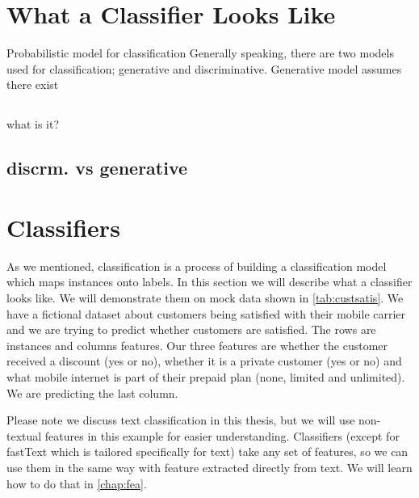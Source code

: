 \section{What a Classifier Looks Like}

Probabilistic model for classification
Generally speaking, there are two models used for classification; generative and discriminative. Generative model assumes there exist 

\subsection{}

what is it?

\subsection{discrm. vs generative}


\section{Classifiers}
\label{chap:clscon}

As we mentioned, classification is a process of building a classification model which maps
instances onto labels.
In this section we will describe what a classifier looks like.
We will demonstrate them on mock data shown in \autoref{tab:custsatis}.
We have a fictional dataset about customers being satisfied with their mobile carrier and
we are trying to predict whether customers are satisfied.
The rows are instances and columns features.
Our three features are 
whether the customer received a discount (yes or no), whether it is a private customer (yes or no)
and what mobile internet is part of their prepaid plan (none, limited and unlimited).
We are predicting the last column.

Please note we discuss text classification in this thesis, but
we will use non-textual features in this example for easier understanding.
Classifiers (except for fastText which is tailored specifically for text) take any set of features,
so we can use them in the same way with feature extracted directly from text.
We will learn how to do that in \autoref{chap:fea}.

